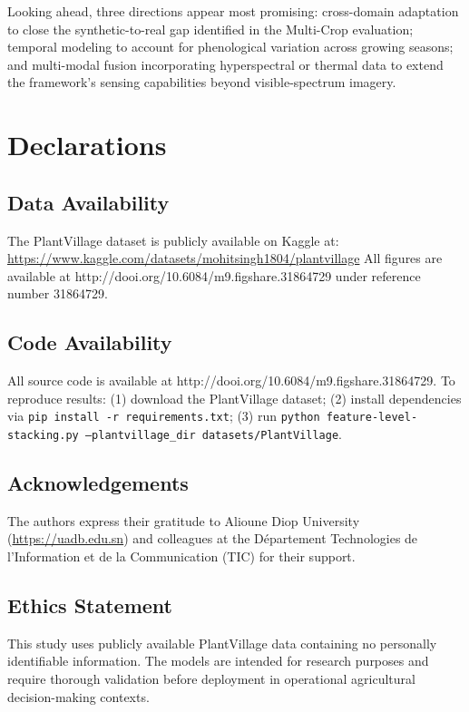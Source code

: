 \documentclass[pdflatex,sn-basic]{sn-jnl}
\begin{document}
Looking ahead, three directions appear most promising: cross-domain adaptation to close the synthetic-to-real gap identified in the Multi-Crop evaluation; temporal modeling to account for phenological variation across growing seasons; and multi-modal fusion incorporating hyperspectral or thermal data to extend the framework's sensing capabilities beyond visible-spectrum imagery.

\section*{Declarations}


\subsection*{Data Availability}
The PlantVillage dataset is publicly available on Kaggle at: \url{https://www.kaggle.com/datasets/mohitsingh1804/plantvillage}
All figures  are available at http://dooi.org/10.6084/m9.figshare.31864729 under reference number 31864729.

\subsection*{Code Availability}
All source code is available at http://dooi.org/10.6084/m9.figshare.31864729. To reproduce results: (1) download the PlantVillage dataset; (2) install dependencies via \texttt{pip install -r requirements.txt}; (3) run \texttt{python feature-level-stacking.py --plantvillage\_dir datasets/PlantVillage}.

\subsection*{Acknowledgements}
The authors express their gratitude to Alioune Diop University (\url{https://uadb.edu.sn}) and colleagues at the Département Technologies de l'Information et de la Communication (TIC) for their support.

\subsection*{Ethics Statement}
This study uses publicly available PlantVillage data containing no personally identifiable information. The models are intended for research purposes and require thorough validation before deployment in operational agricultural decision-making contexts.
\end{document}
